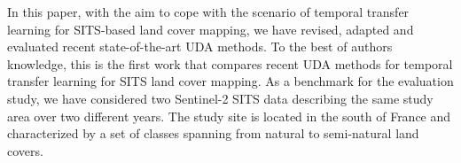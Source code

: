 In this paper, with the aim to cope with the scenario of temporal transfer learning for SITS-based land cover mapping,  we have revised, adapted and evaluated recent state-of-the-art UDA methods. To the best of authors knowledge, this is the first work that compares recent UDA methods for temporal transfer learning for SITS land cover mapping. 
As a benchmark for the evaluation study, we have considered two Sentinel-2 SITS data describing the same study area over two different years. The study site is located in the south of France and characterized by a set of classes spanning from natural to semi-natural land covers.